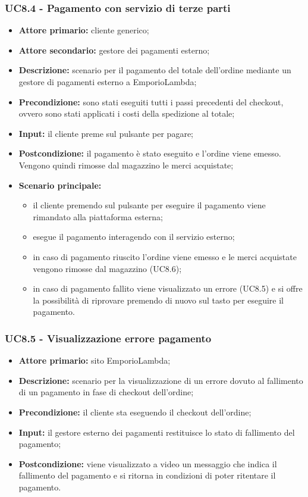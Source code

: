 \subsubsection{UC8.4 - Pagamento con servizio di terze parti}
\label{UC8.4}
\begin{itemize}
    \item \textbf{Attore primario:} cliente generico;
    \item \textbf{Attore secondario:} gestore dei pagamenti esterno;
    \item \textbf{Descrizione:} scenario per il pagamento del totale dell'ordine mediante un gestore di pagamenti esterno a EmporioLambda;
    \item \textbf{Precondizione:} sono stati eseguiti tutti i passi precedenti del checkout, ovvero sono stati applicati i costi della spedizione al totale;
    \item \textbf{Input:} il cliente preme sul pulsante per pagare;
    \item \textbf{Postcondizione:} il pagamento è stato eseguito e l'ordine viene emesso. Vengono quindi rimosse dal magazzino le merci acquistate;
    \item \textbf{Scenario principale:}
    \begin{itemize}
        \item il cliente premendo sul pulsante per eseguire il pagamento viene rimandato alla piattaforma esterna;
        \item esegue il pagamento interagendo con il servizio esterno;
        \item in caso di pagamento riuscito l'ordine viene emesso e le merci acquistate vengono rimosse dal magazzino (UC8.6);
        \item in caso di pagamento fallito viene visualizzato un errore (UC8.5) e si offre la possibilità di riprovare premendo di nuovo sul tasto per eseguire il pagamento.
    \end{itemize}
\end{itemize}

\subsubsection{UC8.5 - Visualizzazione errore pagamento}
\label{UC8.5}
\begin{itemize}
    \item \textbf{Attore primario:} sito EmporioLambda;
    \item \textbf{Descrizione:} scenario per la visualizzazione di un errore dovuto al fallimento di un pagamento in fase di checkout dell'ordine;
    \item \textbf{Precondizione:} il cliente sta eseguendo il checkout dell'ordine;
    \item \textbf{Input:} il gestore esterno dei pagamenti restituisce lo stato di fallimento del pagamento;
    \item \textbf{Postcondizione:} viene visualizzato a video un messaggio che indica il fallimento del pagamento e si ritorna in condizioni di poter ritentare il pagamento.
\end{itemize}

